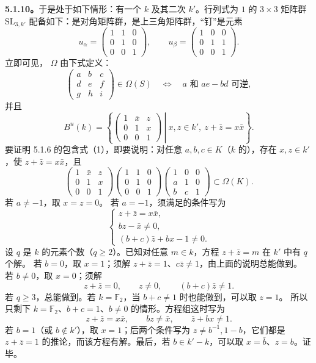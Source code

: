 \textbf{5.1.10。}于是处于如下情形：有一个 $k$ 及其二次 $k'$。行列式为 $1$ 的 $3\times3$ 矩阵群 $\mathrm{SL}_{3,k'}$ 配备如下：是对角矩阵群，是上三角矩阵群，“钉”是元素
\[
 u_\alpha=\begin{pmatrix}1&1&0\\0&1&0\\0&0&1\end{pmatrix},\qquad
 u_\beta=\begin{pmatrix}1&0&0\\0&1&1\\0&0&1\end{pmatrix}.
\]
立即可见， $\Omega$ 由下式定义：
\[
 \begin{pmatrix}a&b&c\\d&e&f\\g&h&i\end{pmatrix}\in\Omega(S)
 \quad\Longleftrightarrow\quad a\text{ 和 }ae-bd\text{ 可逆},
\]
并且
\[
 B^u(k)=\left\{\left.\begin{pmatrix}1&\bar x&z\\0&1&x\\0&0&1\end{pmatrix}\ \right|\ x,z\in k',\ z+\bar z=x\bar x\right\}.
\]
要证明 5.1.6 的包含式（1），即要说明：对任意 $a,b,c\in K$（$k$ 的），存在 $x,z\in k'$，使 $z+\bar z=x\bar x$，且
\[
 \begin{pmatrix}1&\bar x&z\\0&1&x\\0&0&1\end{pmatrix}
 \begin{pmatrix}1&1&0\\0&1&0\\0&0&1\end{pmatrix}
 \begin{pmatrix}1&0&0\\a&1&0\\b&c&1\end{pmatrix}
 \subset\Omega(K).\tag{1}
\]
若 $a\neq-1$，取 $x=z=0$。
若 $a=-1$，须满足的条件写为
\[
 \begin{cases}
 z+\bar z=x\bar x,\\
 bz-\bar x\neq0,\\
 (b+c)\bar z+bx-1\neq0.
 \end{cases}
\]
设 $q$ 是 $k$ 的元素个数（$q\geq2$）。已知对任意 $m\in k$，方程 $z+\bar z=m$ 在 $k'$ 中有 $q$ 个解。
若 $b=0$，取 $x=1$；须解 $z+\bar z=1$、$c\bar z\neq1$，由上面的说明总能做到。
若 $b\neq0$，取 $x=0$；须解
\[
 z+\bar z=0,\qquad z\neq0,\qquad(b+c)\bar z\neq1.
\]
若 $q\geq3$，总能做到。若 $k=\mathbb F_2$，当 $b+c\neq1$ 时也能做到，可以取 $z=1$。
所以只剩下 $k=\mathbb F_2$、$b+c=1$、$b\neq0$ 的情形。方程组这时写为
\[
 z+\bar z=x\bar x,\qquad bz\neq\bar x,\qquad\bar z+bx\neq1.
\]
若 $b=1$（或 $b\notin k'$），取 $x=1$；后两个条件写为 $z\neq b^{-1},1-b$，它们都是 $z+\bar z=1$ 的推论，而该方程有解。最后，若 $b\in k'-k$，可以取 $x=\bar b$、$z=b$。证毕。

